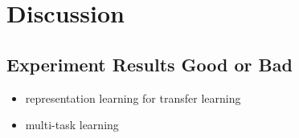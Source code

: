 \section{Discussion}
\label{sec:discussion}

\subsection{Experiment Results Good or Bad}


\begin{itemize}
	\item representation learning for transfer learning
	\item multi-task learning
\end{itemize}